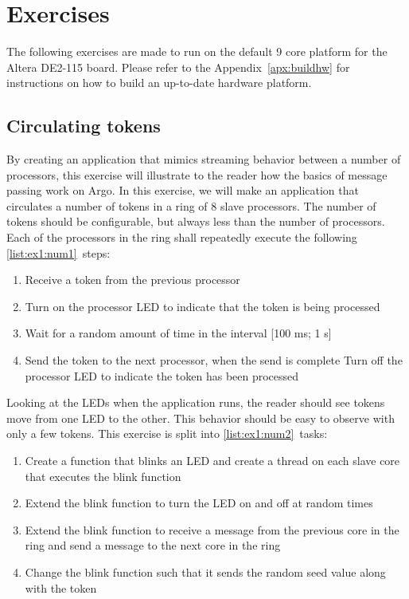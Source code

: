 \documentclass[a4paper,fontsize=10pt,twoside,DIV15,BCOR12mm,headinclude=true,footinclude=false,pagesize,bibtotoc]{scrbook}
\begin{document}

\chapter{Exercises}
\label{chap:exercise}

The following exercises are made to run on the default
9 core platform for the Altera DE2-115 board.
Please refer to the Appendix~\ref{apx:buildhw} for instructions on
how to build an up-to-date hardware platform.

\section{Circulating tokens}
By creating an application that mimics streaming behavior between a number of processors, this exercise will illustrate to the reader how the basics of message passing work on Argo.
In this exercise, we will make an application that circulates a number of tokens in a ring of 8 slave processors.
The number of tokens should be configurable, but always less than the number of processors.
Each of the processors in the ring shall repeatedly execute the following \ref{list:ex1:num1}~steps:

\begin{framed}
\begin{enumerate}
\item Receive a token from the previous processor

\item Turn on the processor LED to indicate that the token is being processed

\item Wait for a random amount of time in the interval [100 ms; 1 s]
\label{list:step_rand}
\item Send the token to the next processor, when the send is complete Turn off the processor LED to indicate the token has been processed

\label{list:ex1:num1}\end{enumerate}
\end{framed}

\noindent Looking at the LEDs when the application runs,
the reader should see tokens move from one LED to the other.
This behavior should be easy to observe with only a few tokens.
This exercise is split into \ref{list:ex1:num2}~tasks:
\begin{framed}
\begin{enumerate}
\item Create a function that blinks an LED and create a thread on each slave core that executes the blink function
\item Extend the blink function to turn the LED on and off at random times
\item Extend the blink function to receive a message from the previous core in the ring and send a message to the next core in the ring
\item Change the blink function such that it sends the random seed value along with the token
\label{list:ex1:num2}\end{enumerate}
\end{framed}
\end{document}

